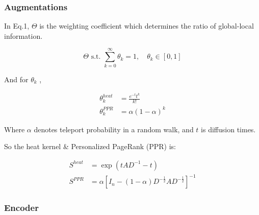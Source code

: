 \documentclass[UTF8]{beamer}
\begin{document}
    \begin{frame}
        \frametitle{Augmentations \cite{gasteiger2019diffusion}}
    
        In Eq.1, $\Theta$ is the weighting coefficient which determines the ratio of global-local information.

        \begin{equation*}
            \Theta \text{ s.t. } \sum_{k=0}^\infty\theta_k = 1, \quad \theta_k \in [0,1]
        \end{equation*}

        And for $\theta_k$ ,

        \begin{equation*}
            \begin{aligned}
                \theta_k^{heat} &= \frac{e^{-t}t^k}{k!}  \\
                \theta_k^{PPR} &= \alpha(1-\alpha)^k
            \end{aligned}
        \end{equation*}

        Where $\alpha$ denotes teleport probability in a random walk, and $t$ is diffusion times.

        So the heat kernel \& Personalized PageRank (PPR) is:

        \begin{equation*}
            \begin{aligned}
            S^{heat} &= \exp(tAD^{-1}-t)  \\
            S^{PPR} &= \alpha[I_n - (1-\alpha)D^{-\frac{1}{2}}AD^{-\frac{1}{2}}]^{-1}
            \end{aligned}
        \end{equation*}
    
    \end{frame}

    \subsubsection{Encoder}
\end{document}
